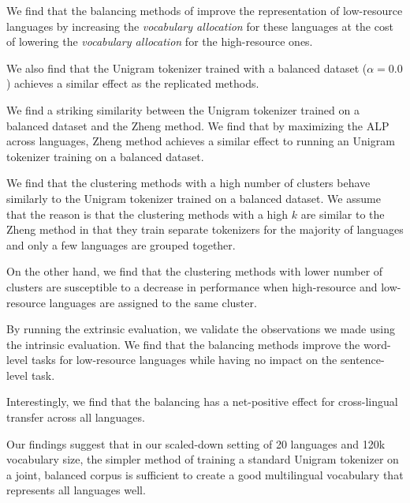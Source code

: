 
We find that the balancing methods of \citet{chung_improving_2020,zheng_allocating_2021,liang_xlm-v_2023} improve the representation of low-resource languages by increasing the \textit{vocabulary allocation} for these languages at the cost of lowering the \textit{vocabulary allocation} for the high-resource ones. 

We also find that the Unigram tokenizer trained with a balanced dataset ($\alpha=0.0$) achieves a similar effect as the replicated methods. 

We find a striking similarity between the Unigram tokenizer trained on a balanced dataset and the Zheng method. We find that by maximizing the ALP across languages, Zheng method achieves a similar effect to running an Unigram tokenizer training on a balanced dataset.

We find that the clustering methods with a high number of clusters behave similarly to the Unigram tokenizer trained on a balanced dataset. We assume that the reason is that the clustering methods with a high $k$ are similar to the Zheng method in that they train separate tokenizers for the majority of languages and only a few languages are grouped together.

On the other hand, we find that the clustering methods with lower number of clusters are susceptible to a decrease in performance when high-resource and low-resource languages are assigned to the same cluster.

By running the extrinsic evaluation, we validate the observations we made using the intrinsic evaluation. We find that the balancing methods improve the word-level tasks for low-resource languages while having no impact on the sentence-level task. 

Interestingly, we find that the balancing has a net-positive effect for cross-lingual transfer across all languages.

Our findings suggest that in our scaled-down setting of 20 languages and 120k vocabulary size, the simpler method of training a standard Unigram tokenizer on a joint, balanced corpus is sufficient to create a good multilingual vocabulary that represents all languages well.




